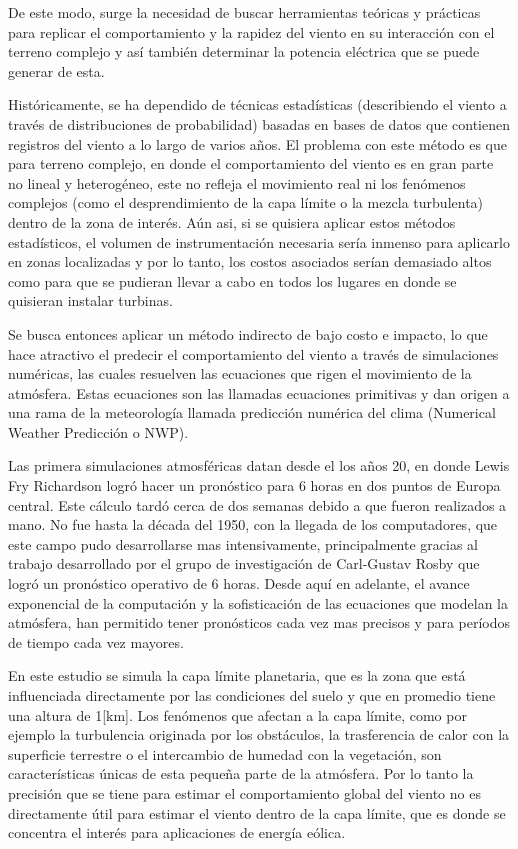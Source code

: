 De este modo, surge la necesidad de buscar herramientas teóricas y prácticas para replicar el comportamiento y la rapidez del viento en su interacción con el terreno complejo y así también determinar la potencia eléctrica que se puede generar de esta.

Históricamente, se ha dependido de técnicas estadísticas (describiendo el viento a través de distribuciones de probabilidad) basadas en bases de datos que contienen registros del viento a lo largo de varios años. El problema con este método es que para terreno complejo, en donde el comportamiento del viento es en gran parte no lineal y heterogéneo, este no refleja el movimiento real ni los fenómenos complejos (como el desprendimiento de la capa límite o la mezcla turbulenta) dentro de la zona de interés. Aún asi, si se quisiera aplicar estos métodos estadísticos, el volumen de instrumentación necesaria sería inmenso para aplicarlo en zonas localizadas y por lo tanto, los costos asociados serían demasiado altos como para que se pudieran llevar a cabo en todos los lugares en donde se quisieran instalar turbinas.

Se busca entonces aplicar un método indirecto de bajo costo e impacto, lo que hace atractivo el predecir el comportamiento del viento a través de simulaciones numéricas, las cuales resuelven las ecuaciones que rigen el movimiento de la atmósfera. Estas ecuaciones son las llamadas ecuaciones primitivas y dan origen a una rama de la meteorología llamada predicción numérica del clima (Numerical Weather Predicción o NWP).

Las primera simulaciones atmosféricas datan desde el los años 20, en donde Lewis Fry Richardson logró hacer un pronóstico para 6 horas en dos puntos de Europa central. Este cálculo tardó cerca de dos semanas debido a que fueron realizados a mano. No fue hasta la década del 1950, con la llegada de los computadores, que este campo pudo desarrollarse mas intensivamente, principalmente gracias al trabajo desarrollado por el grupo de investigación de Carl-Gustav Rosby que logró un pronóstico operativo de 6 horas. Desde aquí en adelante, el avance exponencial de la computación y la sofisticación de las ecuaciones que modelan la atmósfera, han permitido tener pronósticos cada vez mas precisos y para períodos de tiempo cada vez mayores. 

En este estudio se simula la capa límite planetaria, que es la zona que está influenciada directamente por las condiciones del suelo y que en promedio tiene una altura de 1[km]. Los fenómenos que afectan a la capa límite, como por ejemplo la turbulencia originada por los obstáculos, la trasferencia de calor con la superficie terrestre o el intercambio de humedad con la vegetación, son características únicas de esta pequeña parte de la atmósfera. Por lo tanto la precisión que se tiene para estimar el comportamiento global del viento no es directamente útil para estimar el viento dentro de la capa límite, que es donde se concentra el interés para aplicaciones de energía eólica. 

